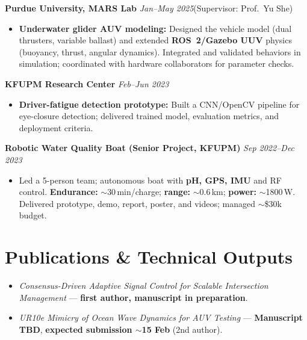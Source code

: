 \documentclass[a4paper,10pt]{article}
\newcommand{\daterange}[1]{\hfill\textit{#1}}
\begin{document}
\vspace{5pt} %

\textbf{Purdue University, MARS Lab} \daterange{Jan--May 2025}\hfill (Supervisor: Prof.\ Yu She)
\begin{itemize}
  \item \textbf{Underwater glider AUV modeling:} Designed the vehicle model (dual thrusters, variable ballast) and extended \textbf{ROS~2/Gazebo UUV} physics (buoyancy, thrust, angular dynamics). Integrated and validated behaviors in simulation; coordinated with hardware collaborators for parameter checks.
\end{itemize}

\vspace{5pt} %

\textbf{KFUPM Research Center} \daterange{Feb--Jun 2023}
\begin{itemize}
  \item \textbf{Driver-fatigue detection prototype:} Built a CNN/OpenCV pipeline for eye-closure detection; delivered trained model, evaluation metrics, and deployment criteria.
\end{itemize}

\vspace{5pt} %

\textbf{Robotic Water Quality Boat (Senior Project, KFUPM)} \daterange{Sep 2022--Dec 2023}
\begin{itemize}
  \item Led a 5-person team; autonomous boat with \textbf{pH, GPS, IMU} and RF control. \textbf{Endurance:} \(\sim\)30\,min/charge; \textbf{range:} \(\sim\)0.6\,km; \textbf{power:} \(\sim\)1800\,W. Delivered prototype, demo, report, poster, and videos; managed \(\sim\)\$30k budget.
\end{itemize}

\section{Publications \& Technical Outputs}
\begin{itemize}
  \item \textit{Consensus-Driven Adaptive Signal Control for Scalable Intersection Management} — \textbf{first author, manuscript in preparation}.
  \item \textit{UR10e Mimicry of Ocean Wave Dynamics for AUV Testing} — \textbf{Manuscript TBD}, \textbf{expected submission \(\sim\)15 Feb} (2nd author).
\end{itemize}
\end{document}
